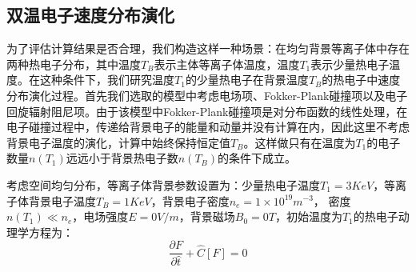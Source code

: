 \subsection{双温电子速度分布演化}
为了评估计算结果是否合理，我们构造这样一种场景：在均匀背景等离子体中存在两种热电子分布，其中温度$T_B$表示主体等离子体温度，温度$T_1$表示少量热电子温度。在这种条件下，我们研究温度$T_1$的少量热电子在背景温度$T_B$的热电子中速度分布演化过程。首先我们选取的模型中考虑电场项、Fokker-Plank碰撞项以及电子回旋辐射阻尼项。由于该模型中Fokker-Plank碰撞项是对分布函数的线性处理，在电子碰撞过程中，传递给背景电子的能量和动量并没有计算在内，因此这里不考虑背景电子温度的演化，计算中始终保持恒定值$T_B$。这样做只有在温度为$T_1$的电子数量$n(T_1)$远远小于背景热电子数$n(T_B )$的条件下成立。\par
考虑空间均匀分布，等离子体背景参数设置为：少量热电子温度$T_1=3KeV$，等离子体背景电子温度$T_B=1KeV$，背景电子密度$n_e=1×10^{19} m^{-3}$， 密度$n(T_1 )≪n_e$，电场强度$E=0 V/m$，背景磁场$B_0=0 T$，初始温度为$T_1$的热电子动理学方程为：
\begin{equation}\label{eq:Rad}
\frac{\partial F}{\partial \hat{t}}+\hat{C}[F]=0
\end{equation}

